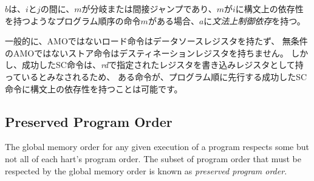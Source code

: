 \begin{comment}
$b$ has a {\em syntactic control dependency} on $a$ if there is an instruction $m$ program-ordered between $i$ and $j$ such that $m$ is a branch or indirect jump and $m$ has a syntactic dependency on $i$.
\end{comment}

$b$は、$i$と$j$の間に、$m$が分岐または間接ジャンプであり、$m$が$i$に構文上の依存性を持つようなプログラム順序の命令$m$がある場合、$a$に{\em 文法上制御依存}を持つ。

\begin{commentary}
\begin{comment}
  Generally speaking, non-AMO load instructions do not have data source registers, and unconditional non-AMO store instructions do not have destination registers.  However, a successful SC instruction is considered to have the register specified in {\em rd} as a destination register, and hence it is possible for an instruction to have a syntactic dependency on a successful SC instruction that precedes it in program order.
\end{comment}

  一般的に、AMOではないロード命令はデータソースレジスタを持たず、
無条件のAMOではないストア命令はデスティネーションレジスタを持ちません。 
しかし、成功したSC命令は、{\em rd}で指定されたレジスタを書き込みレジスタとして持っているとみなされるため、
ある命令が、プログラム順に先行する成功したSC命令に構文上の依存性を持つことは可能です。
\end{commentary}

\subsection*{Preserved Program Order}
The global memory order for any given execution of a program respects some but not all of each hart's program order.
The subset of program order that must be respected by the global memory order is known as {\em preserved program order}.

